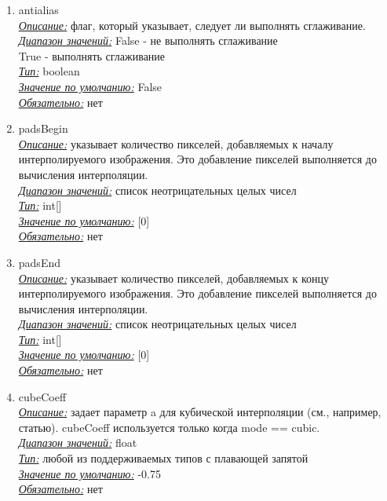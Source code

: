 \documentclass{article}
\begin{document}
\begin{enumerate}
        \item antialias\\
        
        \underline{\textit{Описание:}} флаг, который указывает, следует ли выполнять сглаживание.\\
        \underline{\textit{Диапазон значений:}}
        False - не выполнять сглаживание\\
        True - выполнять сглаживание\\
        \underline{\textit{Тип:}} boolean\\
        \underline{\textit{Значение по умолчанию:}} False\\
        \underline{\textit{Обязательно:}} нет\\
        
        \item padsBegin\\
        
        \underline{\textit{Описание:}} указывает количество пикселей, добавляемых к началу интерполируемого изображения. Это добавление пикселей выполняется до вычисления интерполяции.\\
        \underline{\textit{Диапазон значений:}}
        список неотрицательных целых чисел\\
        \underline{\textit{Тип:}} int[]\\
        \underline{\textit{Значение по умолчанию:}} [0]\\
        \underline{\textit{Обязательно:}} нет\\
        
        \item padsEnd\\
        
        \underline{\textit{Описание:}} указывает количество пикселей, добавляемых к концу интерполируемого изображения. Это добавление пикселей выполняется до вычисления интерполяции.\\
        \underline{\textit{Диапазон значений:}}
        список неотрицательных целых чисел\\
        \underline{\textit{Тип:}} int[]\\
        \underline{\textit{Значение по умолчанию:}} [0]\\
        \underline{\textit{Обязательно:}} нет\\
        
        \item cubeCoeff\\
        
        \underline{\textit{Описание:}} задает параметр a для кубической интерполяции (см., например, статью). cubeCoeff используется только когда mode == cubic.\\
        \underline{\textit{Диапазон значений:}}
        float\\
        \underline{\textit{Тип:}} любой из поддерживаемых типов с плавающей запятой\\
        \underline{\textit{Значение по умолчанию:}} -0.75\\
        \underline{\textit{Обязательно:}} нет\\
        
    \end{enumerate}
\end{document}
